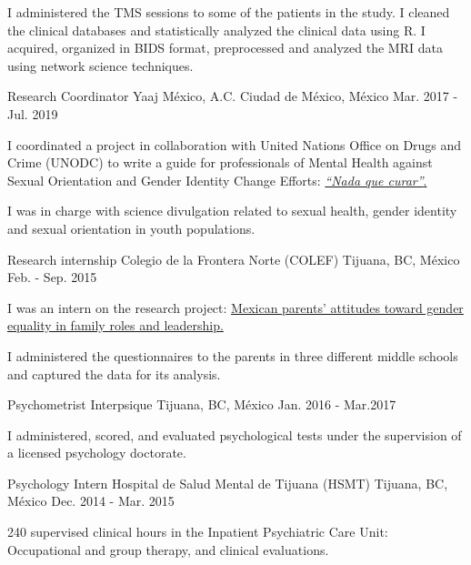 \begin{cventries}
{\begin{cvitems}
                \item {I administered the TMS sessions to some of the patients in the study. I cleaned the clinical databases and statistically analyzed the clinical data using R. I acquired, organized in BIDS format, preprocessed and analyzed the MRI data using network science techniques.}
            \end{cvitems}
        }
    \cventry
        {Research Coordinator}
        {Yaaj México, A.C.}
        {Ciudad de México, México}
        {Mar. 2017 - Jul. 2019}
        {
            \begin{cvitems}
                \item {I coordinated a project in collaboration with United Nations Office on Drugs and Crime (UNODC) to write a guide for professionals of Mental Health against Sexual Orientation and Gender Identity Change Efforts:
                    \href{https://www.unodc.org/documents/mexicoandcentralamerica/2019/GUIAECOSIGFINAL-compressed.pdf}{\textit{``Nada que curar''}.}}
                \item {I was in charge with science divulgation related to sexual health, gender identity and sexual orientation in youth populations.}
            \end{cvitems}
        }
     \cventry
        {Research internship}
        {Colegio de la Frontera Norte (COLEF)}
        {Tijuana, BC, México}
        {Feb. - Sep. 2015}
        {
            \begin{cvitems}
                \item {I was an intern on the research project:
                    \href{https://estudiosdemograficosyurbanos.colmex.mx/index.php/edu/article/view/1791/pdf}{Mexican parents’ attitudes toward gender equality in family roles and leadership.}}
                \item {I administered the questionnaires to the parents in three different middle schools and captured the data for its analysis.}
            \end{cvitems}
        }
\end{cventries}
\vspace{-3mm}
\begin{cventries}
    \cventry
        {Psychometrist}
        {Interpsique}
        {Tijuana, BC, México}
        {Jan. 2016 - Mar.2017}
        {
            \begin{cvitems}
                \item {I administered, scored, and evaluated psychological tests under the supervision of a licensed psychology doctorate.}
            \end{cvitems}
        }
    \cventry
        {Psychology Intern}
        {Hospital de Salud Mental de Tijuana (HSMT)}
        {Tijuana, BC, México}
        {Dec. 2014 - Mar. 2015}
        {
            \begin{cvitems}
                \item {240 supervised clinical hours in the Inpatient
                    Psychiatric Care Unit: Occupational and group therapy, and
                clinical evaluations.}
            \end{cvitems}
        }
\end{cventries}
